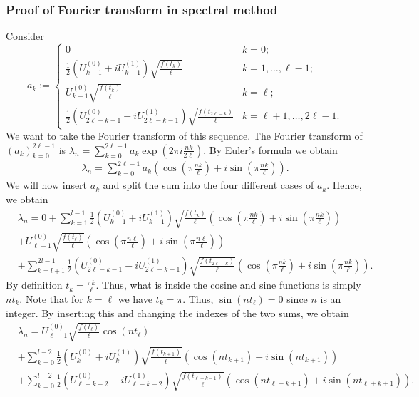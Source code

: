 \documentclass{article}
\begin{document}
\subsubsection{Proof of Fourier transform in spectral method} \label{sec:sim_proof}
Consider 
\[
a_k := \begin{cases}
0 & k = 0; \\
\frac{1}{2} \left( U^{(0)}_{k-1} + i U^{(1)}_{k-1} \right) \sqrt{\frac{f(t_k)}{\ell}} & k = 1, \dots, \ell - 1; \\
U^{(0)}_{k-1} \sqrt{\frac{f(t_k)}{\ell}} & k = \ell; \\
\frac{1}{2} \left( U^{(0)}_{2\ell - k - 1} - i U^{(1)}_{2\ell - k - 1} \right) \sqrt{\frac{f(t_{2\ell - k})}{\ell}} & k = \ell + 1, \dots, 2\ell - 1.
\end{cases}
\]
We want to take the Fourier transform of this sequence. The Fourier transform of $(a_k)_{k=0}^{2\ell-1}$ is $\lambda_n = \sum_{k=0}^{2\ell-1} a_k \exp(2\pi i \frac{nk}{2\ell})$. By Euler's formula we obtain
\begin{align*}
\lambda_n = \sum_{k=0}^{2\ell-1} a_k \left( \cos\left(\pi\frac{nk}{\ell}\right) + i\sin\left(\pi \frac{nk}{\ell}\right)\right).
\end{align*}
We will now insert $a_k$ and split the sum into the four different cases of $a_k$. Hence, we obtain
\begin{align*}
&\lambda_n = 0 + \sum_{k=1}^{l-1} \frac{1}{2} \left( U^{(0)}_{k-1} + i U^{(1)}_{k-1} \right) \sqrt{\frac{f(t_k)}{\ell}} \left( \cos\left(\pi\frac{nk}{\ell}\right) + i\sin\left(\pi \frac{nk}{\ell}\right)\right)\\
&+ U^{(0)}_{\ell-1} \sqrt{\frac{f(t_\ell)}{\ell}}\left( \cos\left(\pi\frac{n\ell}{\ell}\right) + i\sin\left(\pi \frac{n\ell}{\ell}\right)\right)\\
&+ \sum_{k=l+1}^{2l-1} \frac{1}{2} \left( U^{(0)}_{2\ell - k - 1} - i U^{(1)}_{2\ell - k - 1} \right) \sqrt{\frac{f(t_{2\ell - k})}{\ell}}\left( \cos\left(\pi\frac{nk}{\ell}\right) + i\sin\left(\pi \frac{nk}{\ell}\right)\right).
\end{align*}
By definition $t_k=\frac{\pi k}{\ell}$. Thus, what is inside the cosine and sine functions is simply $nt_k$. Note that for $k=\ell$ we have $t_k=\pi$. Thus, $\sin(nt_\ell)=0$ since $n$ is an integer. By inserting this and changing the indexes of the two sums, we obtain
\begin{align*}
&\lambda_n = U^{(0)}_{\ell-1} \sqrt{\frac{f(t_\ell)}{\ell}}\cos(nt_\ell)\\
& + \sum_{k=0}^{l-2} \frac{1}{2} \left( U^{(0)}_{k}+ i U^{(1)}_{k} \right) \sqrt{\frac{f(t_{k+1})}{\ell}} \left( \cos\left(n t_{k+1}\right) + i\sin\left(n t_{k+1}\right)\right)\\
&+ \sum_{k=0}^{l-2}\frac{1}{2} \left( U^{(0)}_{\ell-k-2}- i U^{(1)}_{\ell-k-2} \right) \sqrt{\frac{f(t_{\ell-k-1})}{\ell}} \left( \cos\left(n t_{\ell+k+1}\right) + i\sin\left(n t_{\ell+k+1}\right)\right).
\end{align*}
\end{document}
